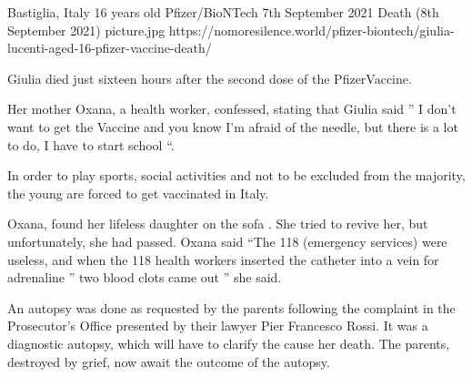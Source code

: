 {Bastiglia, Italy}
{16 years old}
{Pfizer/BioNTech}
{7th September 2021}
{Death (8th September 2021)}
{picture.jpg}
{https://nomoresilence.world/pfizer-biontech/giulia-lucenti-aged-16-pfizer-vaccine-death/}
{

Giulia died just sixteen hours after the second dose of the PfizerVaccine.

Her mother Oxana, a health worker, confessed, stating that Giulia said ” I don’t
want to get the Vaccine and you know I’m afraid of the needle, but there is a
lot to do, I have to start school “.

In order to play sports, social activities and not to be excluded from the
majority, the young are forced to get vaccinated in Italy.

Oxana, found her lifeless daughter on the sofa . She tried to revive her, but
unfortunately, she had passed. Oxana said “The 118 (emergency services) were
useless, and when the 118 health workers inserted the catheter into a vein for
adrenaline ” two blood clots came out ” she said.

An autopsy was done as requested by the parents following the complaint in the
Prosecutor’s Office presented by their lawyer Pier Francesco Rossi. It was a
diagnostic autopsy, which will have to clarify the cause her death. The parents,
destroyed by grief, now await the outcome of the autopsy.

}
